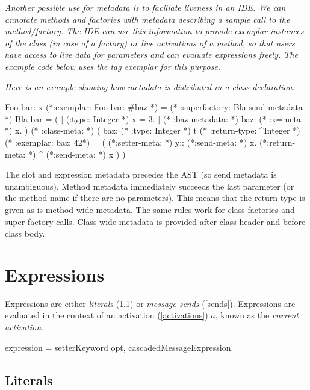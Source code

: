 \documentclass{article}
\begin{document}
{\it
Another possible  use for metadata is to faciliate liveness in an IDE.  We can annotate methods and factories with metadata describing a sample call to the method/factory. The IDE can use this information to provide exemplar instances of the class (in case of a factory) or live activations of a method, so that users have access to live data for parameters and can evaluate expressions freely.
The example code below uses the tag {\em exemplar} for this purpose.
}

{\it
Here is an example showing how metadata is distributed in a class declaration:
\newline
\begin{newspeak}
\CLASS{} Foo bar: x (*:exemplar:  Foo bar: \#baz *) = (* :superfactory: Bla send metadata *) Bla bar = ( 
   $|$ (:type: Integer *) x = 3. $|$    
  (* :baz-metadata: *) baz:  (* :x=meta: *) x.   
) (* :class-meta: *) (   
    baz: (* :type: Integer *) t (* :return-type: \^{}Integer *) (* :exemplar:  baz: 42*) = ( 
       (*:setter-meta: *) y:: (*:send-meta: *) x.       
       (*:return-meta: *) \^{} (*:send-meta: *) x    
    ) 
)
\end{newspeak}

The slot and expression metadata precedes the AST (so send metadata is unambiguous).
Method metadata immediately succeeds the last parameter (or the method name if there are no parameters). This means that the return type is given as is method-wide metadata. The same rules work for class factories and super factory calls. Class wide metadata is provided after class header and before class body.
}

\section{Expressions}
\label{expression}

Expressions are either {\em literals} (\ref{literals}) or {\em message sends} (\ref{sends}). Expressions are evaluated in the context of an activation (\ref{activations}) $a$, known as the {\em current activation}.

\begin{newspeak}
expression = setterKeyword opt, cascadedMessageExpression.
\end{newspeak}

\subsection{Literals}
\label{literals}
\end{document}
